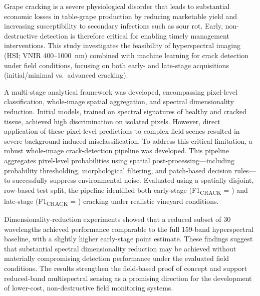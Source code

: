 \noindent
Grape cracking is a severe physiological disorder that leads to substantial economic losses in table-grape production by reducing marketable yield and increasing susceptibility to secondary infections such as sour rot. Early, non-destructive detection is therefore critical for enabling timely management interventions. This study investigates the feasibility of hyperspectral imaging (HSI; VNIR 400--1000~nm) combined with machine learning for crack detection under field conditions, focusing on both early- and late-stage acquisitions (initial/minimal vs.\ advanced cracking).

\medskip
\noindent
A multi-stage analytical framework was developed, encompassing pixel-level classification, whole-image spatial aggregation, and spectral dimensionality reduction. Initial models, trained on spectral signatures of healthy and cracked tissue, achieved high discrimination on isolated pixels. However, direct application of these pixel-level predictions to complex field scenes resulted in severe background-induced misclassification. To address this critical limitation, a robust whole-image crack-detection pipeline was developed. This pipeline aggregates pixel-level probabilities using spatial post-processing---including probability thresholding, morphological filtering, and patch-based decision rules---to successfully suppress environmental noise. Evaluated using a spatially disjoint, row-based test split, the pipeline identified both early-stage (F1\textsubscript{CRACK} = \FoneEarlyBaseline{}) and late-stage (F1\textsubscript{CRACK} = \FoneLateBaseline{}) cracking under realistic vineyard conditions.

\medskip
\noindent
Dimensionality-reduction experiments showed that a reduced subset of 30 wavelengths achieved performance comparable to the full 159-band hyperspectral baseline, with a slightly higher early-stage point estimate. These findings suggest that substantial spectral dimensionality reduction may be achieved without materially compromising detection performance under the evaluated field conditions. The results strengthen the field-based proof of concept and support reduced-band multispectral sensing as a promising direction for the development of lower-cost, non-destructive field monitoring systems.